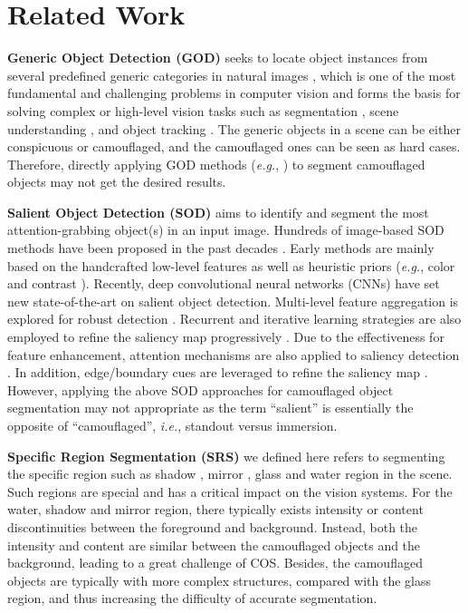\documentclass[final]{cvpr}
\begin{document}
\section{Related Work}


\textbf{Generic Object Detection (GOD)} seeks to locate object instances from several predefined generic categories in natural images \cite{Liu2018Deep_god}, which is one of the most fundamental and challenging problems in computer vision and forms the basis for solving complex or high-level vision tasks such as segmentation \cite{kirillov2019panoptic}, scene understanding \cite{li2009towards_total}, and object tracking \cite{yilmaz2006object_survey}. The generic objects in a scene can be either conspicuous or camouflaged, and the camouflaged ones can be seen as hard cases. Therefore, directly applying GOD methods (\emph{e.g.}, \cite{lin2017feature_fpn,he2017mask_maskrcnn,huang2019mask_msrcnn}) to segment camouflaged objects may not get the desired results.

\textbf{Salient Object Detection (SOD)} aims to identify and segment the most attention-grabbing object(s) in an input image. Hundreds of image-based SOD methods have been proposed in the past decades \cite{Fan_2018_ECCV_clutter}. Early methods are mainly based on the handcrafted low-level features as well as heuristic priors (\emph{e.g.}, color \cite{achanta2009frequency} and contrast \cite{cheng2014global}). Recently, deep convolutional neural networks (CNNs) have set new state-of-the-art on salient object detection. Multi-level feature aggregation is explored for robust detection \cite{Lee_2016_CVPR,HouPami19Dss,Zhang_2017_ICCV,Zhao_2019_CVPR_pfan}. Recurrent and iterative learning strategies are also employed to refine the saliency map progressively \cite{Zhang_2018_CVPR_progressive,Wang_2019_CVPR_iterative}. Due to the effectiveness for feature enhancement, attention mechanisms \cite{vaswani2017attention,Woo_2018_ECCV_cbam} are also applied to saliency detection \cite{Liu_2018_CVPR_picanet,Chen_2018_ECCV_ras}.
In addition, edge/boundary cues are leveraged to refine the saliency map \cite{Qin_2019_CVPR_basnet,zhao2019egnet,Su_2019_ICCV_banet}.
However, applying the above SOD approaches for camouflaged object segmentation may not appropriate as the term ``salient'' is essentially the opposite of ``camouflaged'', \emph{i.e.}, standout versus immersion.

\textbf{Specific Region Segmentation (SRS)} we defined here refers to segmenting the specific region such as shadow \cite{Hu_2018_CVPR_dsc,Le_2018_ECCV_ad_net,Zhu_2018_ECCV_bdrar,zheng2019distraction}, mirror \cite{Yang_2019_ICCV_mirror,Mei_2021_CVPR_PDNet}, glass \cite{Mei_2020_CVPR_glass,xie2020segmenting_glass} and water \cite{Han_2018_ECCV_water} region in the scene. Such regions are special and has a critical impact on the vision systems. For the water, shadow and mirror region, there typically exists intensity or content discontinuities between the foreground and background. Instead, both the intensity and content are similar between the camouflaged objects and the background, leading to a great challenge of COS. Besides, the camouflaged objects are typically with more complex structures, compared with the glass region, and thus increasing the difficulty of accurate segmentation.
\end{document}
